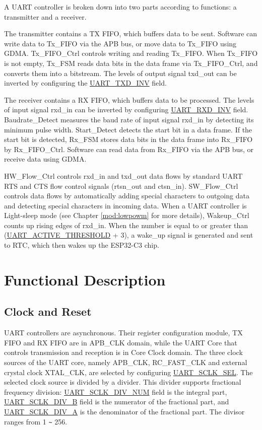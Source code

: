 \documentclass[main\_\_EN.tex]{subfiles}
\begin{document}
A UART controller is broken down into two parts according to functions: a transmitter and a receiver.

The transmitter contains a TX FIFO, which buffers data to be sent. Software can write data to Tx\_FIFO via the APB bus, or move data to Tx\_FIFO using GDMA. Tx\_FIFO\_Ctrl controls writing and reading Tx\_FIFO. When Tx\_FIFO is not empty, Tx\_FSM reads data bits in the data frame via Tx\_FIFO\_Ctrl, and converts them into a bitstream. The levels of output signal txd\_out can be inverted by configuring the \hyperref[fielddesc:UARTTXDINV]{UART\_TXD\_INV} field.

The receiver contains a RX FIFO, which buffers data to be processed. The levels of input signal rxd\_in can be inverted by configuring \hyperref[fielddesc:UARTRXDINV]{UART\_RXD\_INV} field. Baudrate\_Detect measures the baud rate of input signal rxd\_in by detecting its minimum pulse width. Start\_Detect detects the start bit in a data frame. If the start bit is detected, Rx\_FSM stores data bits in the data frame into Rx\_FIFO by Rx\_FIFO\_Ctrl. Software can read data from Rx\_FIFO via the APB bus, or receive data using GDMA. 

HW\_Flow\_Ctrl controls rxd\_in and txd\_out data flows by standard UART RTS and CTS flow control signals (rtsn\_out and ctsn\_in). SW\_Flow\_Ctrl controls data flows by automatically adding special characters to outgoing data and detecting special characters in incoming data. When a UART controller is Light-sleep mode (see Chapter \ref{mod:lowpowm} \textit{} for more details), Wakeup\_Ctrl counts up rising edges of rxd\_in. When the number is equal to or greater than (\hyperref[fielddesc:UARTACTIVETHRESHOLD]{UART\_ACTIVE\_THRESHOLD} + 3), a wake\_up signal is generated and sent to RTC, which then wakes up the ESP32-C3 chip.

\section{Functional Description}

\subsection{Clock and Reset}

UART controllers are asynchronous. Their register configuration module, TX FIFO and RX FIFO are in APB\_CLK domain, while the UART Core that controls transmission and reception is in Core Clock domain. The three clock sources of the UART core, namely APB\_CLK, RC\_FAST\_CLK and external crystal clock XTAL\_CLK, are selected by configuring \hyperref[fielddesc:UARTSCLKSEL]{UART\_SCLK\_SEL}. The selected clock source is divided by a divider. This divider supports fractional frequency division: \hyperref[fielddesc:UARTSCLKDIVNUM]{UART\_SCLK\_DIV\_NUM} field is the integral part,  \hyperref[fielddesc:UARTSCLKDIVB]{UART\_SCLK\_DIV\_B} field is the numerator of the fractional part, and \hyperref[fielddesc:UARTSCLKDIVA]{UART\_SCLK\_DIV\_A} is the denominator of the fractional part. The divisor ranges from 1 \verb+~+ 256.
\end{document}
